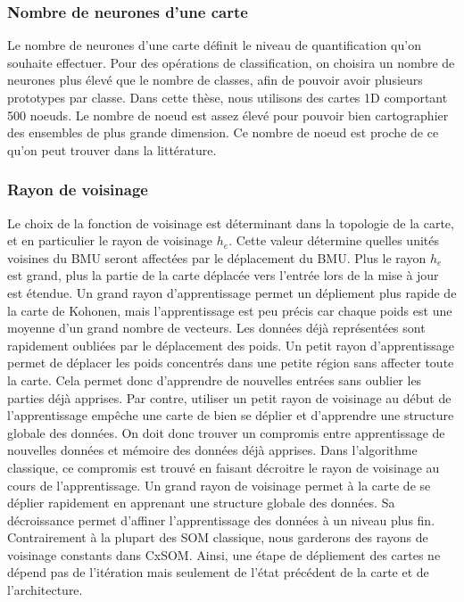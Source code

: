 \subsubsection{Nombre de neurones d'une carte}
Le nombre de neurones d'une carte définit le niveau de quantification qu'on souhaite effectuer. Pour des opérations de classification, on choisira un nombre de neurones plus élevé que le nombre de classes, afin de pouvoir avoir plusieurs prototypes par classe.
Dans cette thèse, nous utilisons des cartes 1D comportant 500 noeuds. Le nombre de noeud est assez élevé pour pouvoir bien cartographier des ensembles de plus grande dimension. Ce nombre de noeud est proche de ce qu'on peut trouver dans la littérature.

\subsubsection{Rayon de voisinage}
Le choix de la fonction de voisinage est déterminant dans la topologie de la carte, et en particulier le rayon de voisinage $h_e$.
Cette valeur détermine quelles unités voisines du BMU seront affectées par le déplacement du BMU.
Plus le rayon $h_e$ est grand, plus la partie de la carte déplacée vers l'entrée lors de la mise à jour est étendue. Un grand rayon d'apprentissage permet un dépliement plus rapide de la carte de Kohonen, mais l'apprentissage est peu précis car chaque poids est une moyenne d'un grand nombre de vecteurs. Les données déjà représentées sont rapidement oubliées par le déplacement des poids.
Un petit rayon d'apprentissage permet de déplacer les poids concentrés dans une petite région sans affecter toute la carte. Cela permet donc d'apprendre de nouvelles entrées sans oublier les parties déjà apprises. Par contre, utiliser un petit rayon de voisinage au début de l'apprentissage empêche une carte de bien se déplier et d'apprendre une structure globale des données. On doit donc trouver un compromis entre apprentissage de nouvelles données et mémoire des données déjà apprises.
Dans l'algorithme classique, ce compromis est trouvé en faisant décroitre le rayon de voisinage au cours de l'apprentissage. Un grand rayon de voisinage permet à la carte de se déplier rapidement en apprenant une structure globale des données. Sa décroissance permet d'affiner l'apprentissage des données à un niveau plus fin. 
Contrairement à la plupart des SOM classique, nous garderons des rayons de voisinage constants dans CxSOM. Ainsi, une étape de dépliement des cartes ne dépend pas de l'itération mais seulement de l'état précédent de la carte et de l'architecture.

